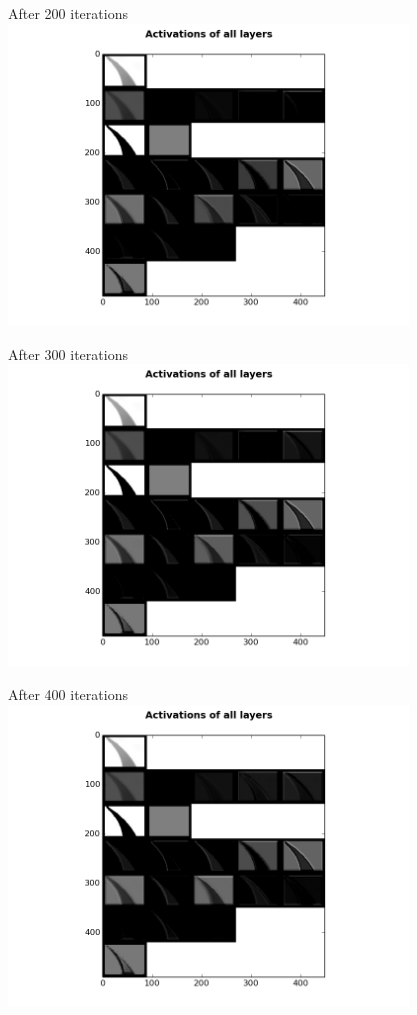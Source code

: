 \begin{frame}{After 200 iterations}
\includegraphics[height=8.0cm]{data/activations/output-200.png}\\ 
\end{frame}

\begin{frame}{After 300 iterations}
\includegraphics[height=8.0cm]{data/activations/output-300.png}\\ 
\end{frame}

\begin{frame}{After 400 iterations}
\includegraphics[height=8.0cm]{data/activations/output-400.png}\\ 
\end{frame}

